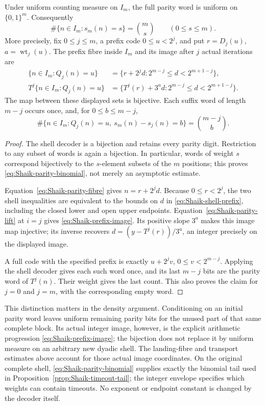 \begin{corollary}
\label{cor:Shaik-parity-counting}
Under uniform counting measure on \(I_m\), the full parity word is
uniform on \(\{0,1\}^m\). Consequently
\begin{equation}\label{eq:Shaik-parity-binomial}
 \#\{n\in I_m:s_m(n)=s\}=\binom ms\qquad(0\le s\le m).
\end{equation}
More precisely, fix \(0\le j\le m\), a prefix code \(0\le u<2^j\),
and put \(r=D_j(u)\), \(a=\operatorname{wt}_j(u)\). The prefix fibre
inside \(I_m\) and its image after \(j\) actual iterations are
\begin{align}
 \{n\in I_m:Q_j(n)=u\}
   &=\{r+2^j d:2^{m-j}\le d<2^{m+1-j}\},\label{eq:Shaik-shell-prefix}\\
 T^j\{n\in I_m:Q_j(n)=u\}
   &=\{T^j(r)+3^a d:2^{m-j}\le d<2^{m+1-j}\}.
 \label{eq:Shaik-prefix-image}
\end{align}
The map between these displayed sets is bijective. Each suffix word
of length \(m-j\) occurs once, and, for \(0\le b\le m-j\),
\[
 \#\{n\in I_m:Q_j(n)=u,\ s_m(n)-s_j(n)=b\}
       =\binom{m-j}{b}.
\]
\end{corollary}
\begin{proof}
The shell decoder is a bijection and retains every parity digit.
Restriction to any subset of words is again a bijection. In particular,
words of weight \(s\) correspond bijectively to the \(s\)-element
subsets of the \(m\) positions; this proves
\eqref{eq:Shaik-parity-binomial}, not merely an asymptotic estimate.

Equation~\eqref{eq:Shaik-parity-fibre} gives \(n=r+2^j d\).
Because \(0\le r<2^j\), the two shell inequalities are equivalent to
the bounds on \(d\) in \eqref{eq:Shaik-shell-prefix}, including the
closed lower and open upper endpoints. Equation~\eqref{eq:Shaik-parity-lift}
at \(i=j\) gives \eqref{eq:Shaik-prefix-image}. Its positive slope
\(3^a\) makes this image map injective; its inverse recovers
\(d=(y-T^j(r))/3^a\), an integer precisely on the displayed image.

A full code with the specified prefix is exactly \(u+2^j v\),
\(0\le v<2^{m-j}\). Applying the shell decoder gives each such
word once, and its last \(m-j\) bits are the parity word of \(T^j(n)\).
Their weight gives the last count. This also proves the claim
for \(j=0\) and \(j=m\), with the corresponding empty word.
\end{proof}

This distinction matters in the density argument. Conditioning on an
initial parity word leaves uniform remaining parity bits for the
unused part of that same complete block. Its actual integer image,
however, is the explicit arithmetic progression
\eqref{eq:Shaik-prefix-image}; the bijection does not replace it by
uniform measure on an arbitrary new dyadic shell. The landing-fibre
and transport estimates above account for those actual image coordinates.
On the original complete shell,
\eqref{eq:Shaik-parity-binomial} supplies exactly the binomial tail
used in Proposition~\ref{prop:Shaik-timeout-tail}; the integer envelope
specifies which weights can contain timeouts. No exponent or
endpoint constant is changed by the decoder itself.

